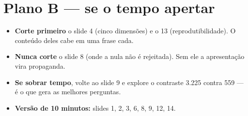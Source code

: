 \documentclass[11pt,a4paper]{article}
\begin{document}
\section{Plano B --- se o tempo apertar}
\begin{itemize}
  \item \textbf{Corte primeiro} o slide 4 (cinco dimensões) e o 13 (reprodutibilidade). O conteúdo deles cabe em uma frase cada.
  \item \textbf{Nunca corte} o slide 8 (onde a nula não é rejeitada). Sem ele a apresentação vira propaganda.
  \item \textbf{Se sobrar tempo}, volte ao slide 9 e explore o contraste 3.225 contra 559 --- é o que gera as melhores perguntas.
  \item \textbf{Versão de 10 minutos:} slides 1, 2, 3, 6, 8, 9, 12, 14.
\end{itemize}
\end{document}
